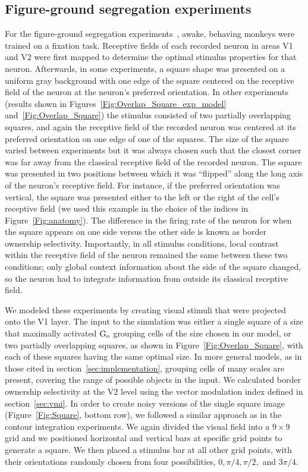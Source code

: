 \subsection{Figure-ground segregation experiments} 
\label{sec:FGO}
For the figure-ground segregation experiments~\citep{Zhou_etal00, Qiu_etal07, Zhang_vonderHeydt10}, awake, behaving monkeys were trained on a fixation task. Receptive fields of each recorded neuron in areas V1 and V2 were first mapped to determine the optimal stimulus properties for that neuron. Afterwards, in some experiments, a square shape was presented on a uniform gray background with one edge of the square centered on the receptive field of the neuron at the neuron's preferred orientation. In other experiments (results shown in
Figures~\ref{Fig:Overlap_Square_exp_model} and~\ref{Fig:Overlap_Square})
the stimulus consisted of two partially overlapping squares, and again the receptive field of the recorded neuron was centered at its preferred orientation on one edge of one of the squares. The size of the square varied between experiments but it was always chosen such
that the closest corner was far away from the classical receptive
field of the recorded neuron. The square was presented in two positions between which it was ``flipped'' along the long axis of the neuron's receptive field. For instance, if the preferred orientation was vertical, the square was presented either to the left or the right of the cell's receptive field (we used this example in the choice of the indices in Figure~\ref{Fig:anatomy}).  The difference in the firing rate of the neuron for when the square appears on one side versus the other side is known as border ownership selectivity. Importantly, in all stimulus conditions, local contrast within the receptive field of the neuron remained the same between these two conditions; only global context information about the side of the square changed, so the neuron had to integrate information from outside its classical receptive field.

We modeled these experiments by creating visual stimuli that were projected onto the V1 layer. The input to the simulation was either a single square of a size that maximally activated $\rm G_o$ grouping cells of the size chosen in our model, or two partially overlapping squares, as shown in Figure~\ref{Fig:Overlap_Square}, with each of these squares having the same optimal size. In more general models, as in those cited in section~\ref{sec:implementation}, grouping cells of many scales are present, covering the range of possible objects in the
input. We calculated border ownership selectivity at the V2 level using the vector modulation index defined in section~\ref{sec:vmi}. In order to create noisy versions of the single square image (Figure~\ref{Fig:Square}, bottom row), we followed a similar approach as in the contour integration experiments.  We again divided the visual field into a $9 \times 9$ grid and we positioned horizontal and vertical bars at specific grid points to generate a square. We then placed a stimulus bar at all other grid points, with their orientations randomly chosen from four possibilities, $0, \pi/4, \pi/2,$ and $3\pi/4$.

